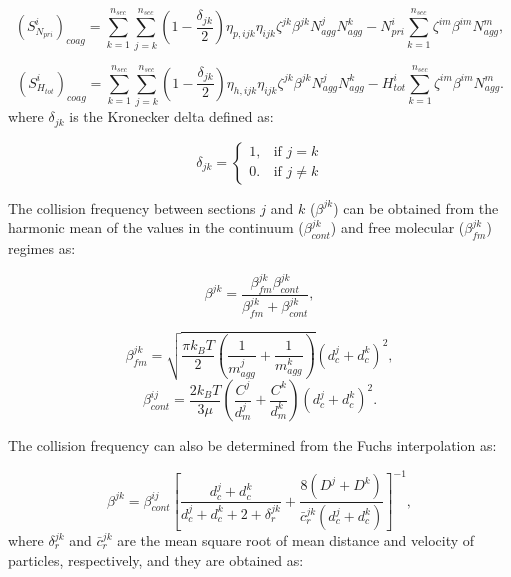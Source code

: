\begin{equation}
	\left(S^i_{N_{pri}}\right)_{coag}
	=
	\sum_{k=1}^{n_{sec}}\sum_{j=k}^{n_{sec}}
	\left(
	1-\frac{\delta_{jk}}{2}
	\right)
	\eta_{p,ijk}\eta_{ijk}\zeta^{jk}\beta^{jk}N^j_{agg}N^k_{agg}
	-
	N^i_{pri}
	\sum_{k=1}^{n_{sec}}\zeta^{im}\beta^{im}N^m_{agg},
	\label{eqn:IcoagNprisect}
\end{equation}

\begin{equation}
	\left(S^i_{H_{tot}}\right)_{coag}
	=
	\sum_{k=1}^{n_{sec}}\sum_{j=k}^{n_{sec}}
	\left(
	1-\frac{\delta_{jk}}{2}
	\right)
	\eta_{h,ijk}\eta_{ijk}\zeta^{jk}\beta^{jk}N^j_{agg}N^k_{agg}
	-
	H^i_{tot}
	\sum_{k=1}^{n_{sec}}\zeta^{im}\beta^{im}N^m_{agg}.
	\label{eqn:IcoagHtotsect}
\end{equation}
\noindent where ${\delta_{jk}}$ is the Kronecker delta defined as:

\begin{equation}
	\delta_{jk}=
	\left\{
	\begin{array}{lr}
		1, & \text{if } j = k\\
		0. & \text{if } j \neq k
	\end{array}
	\right.
	\label{eqn:deltakronecker}
\end{equation}

The collision frequency between sections $j$ and $k$ ($\beta^{jk}$) can be obtained from the harmonic mean of the values in the continuum ($\beta_{cont}^{jk}$) and free molecular ($\beta_{fm}^{jk}$) regimes as:

\begin{equation}
	\beta^{jk} = 				       \frac{\beta^{jk}_{fm}\beta^{jk}_{cont}}{\beta^{jk}_{fm}
		+\beta^{jk}_{cont}}
	\label{eqn:betahmsect},
\end{equation}

\begin{equation}
	\beta^{jk}_{fm} =
	\sqrt{
		\frac{\pi k_B T}{2}
		\left(
		\frac{1}{m^j_{agg}}+
		\frac{1}{m^k_{agg}}
		\right)
	} 
	\left(
	d^j_c+d^k_c
	\right)^2
	\label{eqn:betafmsect},
\end{equation}
\begin{equation}
	\beta^{ij}_{cont} = \frac{2k_BT}{3\mu}
	\left(
	\frac{C^j}{d^j_m}+
	\frac{C^k}{d^k_m}
	\right)
	\left(
	d^j_c+d^k_c
	\right)^2
	\label{eqn:betacontsect}.
\end{equation}

The collision frequency can also be determined from the Fuchs interpolation as:

\begin{equation}
	\beta^{jk}=
	\beta^{ij}_{cont}
	\left[
	\frac{d^j_c+d^k_c}{d^j_c+d^k_c+2+\delta^{jk}_r}+
	\frac{8\left(D^j+D^k\right)}
	{\bar{c}^{jk}_r\left(d^j_c+d^k_c\right)}
	\right]^{-1},
	\label{eqn:betafuchssect}
\end{equation}
\noindent where ${\delta^{jk}_r}$ and ${\bar{c}^{jk}_r}$ are the mean square root of mean distance and velocity of particles, respectively, and they are obtained as:

